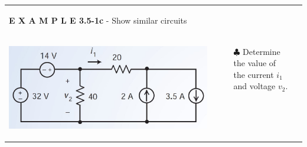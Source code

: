 \documentclass[aspectratio=169]{beamer}
\begin{document}
\begin{frame}[fragile]
\begin{tabular}{ll}
\begin{columns}[c]
				\textbf{E X A M P L E 3.5-1c} -   Show similar circuits
			\end{columns}	
		 \\
			\begin{columns}
				\begin{column}{0.5\textwidth}  %
    					\begin{center}	
     						\includegraphics[width=.8\textwidth]{figura19.JPG}
     					\end{center}	
				\end{column}
				\begin{column}{0.5\textwidth}  %
					\begin{itemize}
						\item[$\clubsuit$] Determine the value of the current $i_{1}$ and voltage $v_{2}$.
					\end{itemize}
				\end{column}
			\end{columns}	
		
   		\end{tabular}
\end{frame}


\end{document}
